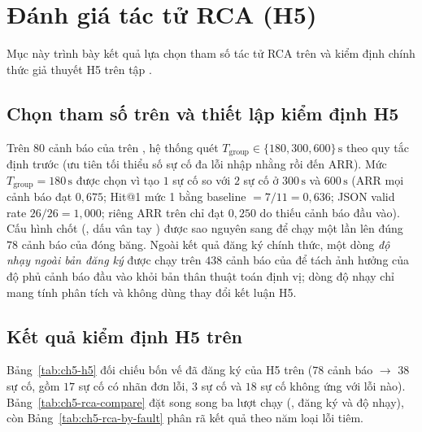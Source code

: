 \section{Đánh giá tác tử RCA (H5)}
\label{sec:ch5-rca}

Mục này trình bày kết quả lựa chọn tham số tác tử RCA trên  và kiểm định chính thức giả thuyết H5 trên tập .

\subsection{Chọn tham số trên  và thiết lập kiểm định H5}
\label{sec:ch5-rca-setup}

Trên $80$ cảnh báo của \CTAV{} trên , hệ thống quét $T_{\text{group}} \in \{180, 300, 600\}\,\text{s}$ theo quy tắc định trước (ưu tiên tối thiểu số sự cố đa lỗi nhập nhằng  rồi đến ARR). Mức $T_{\text{group}} = 180\,\text{s}$ được chọn vì tạo $1$ sự cố  so với $2$ sự cố ở $300\,\text{s}$ và $600\,\text{s}$ (ARR mọi cảnh báo đạt $0{,}675$; Hit@1 mức 1 bằng baseline $= 7/11 = 0{,}636$; JSON valid rate $26/26 = 1{,}000$; riêng ARR trên  chỉ đạt $0{,}250$ do thiếu cảnh báo đầu vào). Cấu hình chốt (, dấu vân tay ) được sao nguyên sang  để chạy một lần lên đúng $78$ cảnh báo của \CTAV{} đóng băng. Ngoài kết quả đăng ký chính thức, một dòng \emph{độ nhạy ngoài bản đăng ký} được chạy trên $438$ cảnh báo của  để tách ảnh hưởng của độ phủ cảnh báo đầu vào khỏi bản thân thuật toán định vị; dòng độ nhạy chỉ mang tính phân tích và không dùng thay đổi kết luận H5.

\subsection{Kết quả kiểm định H5 trên }
\label{sec:ch5-rca-results}

Bảng~\ref{tab:ch5-h5} đối chiếu bốn vế đã đăng ký của H5 trên  ($78$ cảnh báo $\to$ $38$ sự cố, gồm $17$ sự cố có nhãn đơn lỗi, $3$ sự cố  và $18$ sự cố không ứng với lỗi nào). Bảng~\ref{tab:ch5-rca-compare} đặt song song ba lượt chạy (,  đăng ký và  độ nhạy), còn Bảng~\ref{tab:ch5-rca-by-fault} phân rã kết quả theo năm loại lỗi tiêm.

